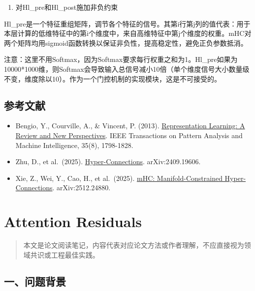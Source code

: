 \begin{enumerate}
\def\labelenumi{\arabic{enumi}.}
\setcounter{enumi}{1}
\tightlist
\item
  对Hl\_pre和Hl\_post施加非负约束
\end{enumerate}

Hl\_pre是一个特征重组矩阵，调节各个特征的信号。其第i行第j列的值代表：用于本层计算的低维特征中的第i个维度中，来自高维特征中第j个维度的权重。mHC对两个矩阵均用sigmoid函数转换以保证非负性，提高稳定性，避免正负参数抵消。

注意：这里不用Softmax，因为Softmax要求每行权重之和为1。Hl\_pre如果为10000*1000维，则Softmax会导致输入总信号减小10倍（单个维度信号大小数量级不变，维度除以10）。作为一个门控机制的实现模块，这是不可接受的。

\hypertarget{ux53c2ux8003ux6587ux732e-103}{%
\subsection{参考文献}\label{ux53c2ux8003ux6587ux732e-103}}

\vspace{0.25em}
\begin{itemize}
\tightlist
\item
  Bengio, Y., Courville, A., \& Vincent, P. (2013). \href{https://arxiv.org/abs/1206.5538}{Representation Learning: A Review and New Perspectives}. IEEE Transactions on Pattern Analysis and Machine Intelligence, 35(8), 1798-1828.
\item
  Zhu, D., et al.~(2025). \href{https://arxiv.org/abs/2409.19606}{Hyper-Connections}. arXiv:2409.19606.
\item
  Xie, Z., Wei, Y., Cao, H., et al.~(2025). \href{https://arxiv.org/abs/2512.24880}{mHC: Manifold-Constrained Hyper-Connections}. arXiv:2512.24880.
\end{itemize}

\clearpage

\hypertarget{attention-residuals}{%
\section{Attention Residuals}\label{attention-residuals}}

\begin{quote}
本文是论文阅读笔记，内容代表对应论文方法或作者理解，不应直接视为领域共识或工程最佳实践。
\end{quote}

\hypertarget{ux4e00ux95eeux9898ux80ccux666f}{%
\subsection{一、问题背景}\label{ux4e00ux95eeux9898ux80ccux666f}}

